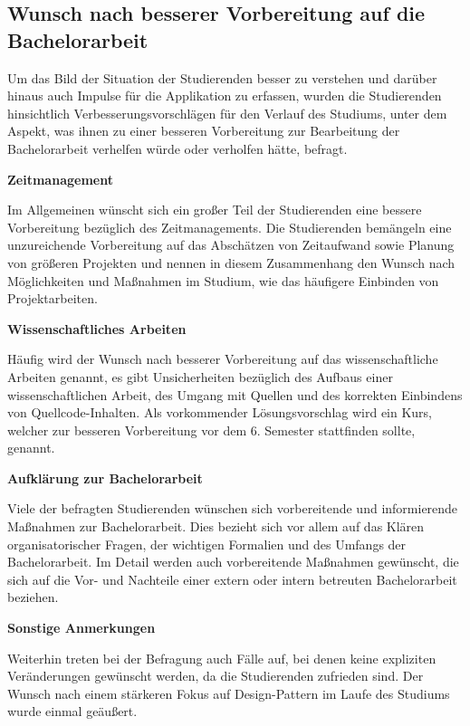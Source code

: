 \documentclass[bibliography=totoc,listof=totoc,BCOR=5mm,DIV=12,oneside]{scrbook}
\begin{document}
\newpage
\subsection{Wunsch nach besserer Vorbereitung auf die Bachelorarbeit}
\par Um das Bild der Situation der Studierenden besser zu verstehen und darüber hinaus auch Impulse für die Applikation zu erfassen, wurden die Studierenden hinsichtlich Verbesserungsvorschlägen für den Verlauf des Studiums, unter dem Aspekt, was ihnen zu einer besseren Vorbereitung zur Bearbeitung der Bachelorarbeit verhelfen würde oder verholfen hätte, befragt.

\par \bigskip \textbf{Zeitmanagement}
\par Im Allgemeinen wünscht sich ein großer Teil der Studierenden eine bessere Vorbereitung bezüglich des Zeitmanagements. Die Studierenden bemängeln eine unzureichende Vorbereitung auf das Abschätzen von Zeitaufwand sowie Planung von größeren Projekten und nennen in diesem Zusammenhang den Wunsch nach Möglichkeiten und Maßnahmen im Studium, wie das häufigere Einbinden von Projektarbeiten.

\par \bigskip \textbf{Wissenschaftliches Arbeiten}
\par Häufig wird der Wunsch nach besserer Vorbereitung auf das wissenschaftliche Arbeiten genannt, es gibt Unsicherheiten bezüglich des Aufbaus einer wissenschaftlichen Arbeit, des Umgang mit Quellen und des korrekten Einbindens von Quellcode-Inhalten. Als vorkommender Lösungsvorschlag wird ein Kurs, welcher zur besseren Vorbereitung vor dem 6. Semester stattfinden sollte, genannt.

\par \bigskip \textbf{Aufklärung zur Bachelorarbeit}
\par Viele der befragten Studierenden wünschen sich vorbereitende und informierende Maßnahmen zur Bachelorarbeit. Dies bezieht sich vor allem auf das Klären organisatorischer Fragen, der wichtigen Formalien und des Umfangs der Bachelorarbeit. Im Detail werden auch vorbereitende Maßnahmen gewünscht, die sich auf die Vor- und Nachteile einer extern oder intern betreuten Bachelorarbeit beziehen.

\par \bigskip \textbf{Sonstige Anmerkungen}
\par Weiterhin treten bei der Befragung auch Fälle auf, bei denen keine expliziten Veränderungen gewünscht werden, da die Studierenden zufrieden sind. Der Wunsch nach einem stärkeren Fokus auf Design-Pattern im Laufe des Studiums wurde einmal geäußert.
\end{document}
